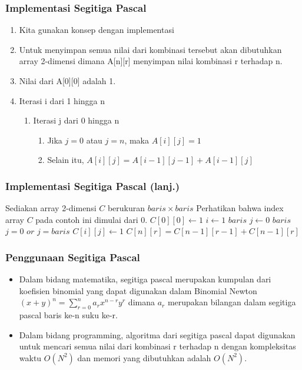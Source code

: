 \begin{frame}
\frametitle{Implementasi Segitiga Pascal}
\begin{enumerate}
  \item Kita gunakan konsep  dengan implementasi 
  \item Untuk menyimpan semua nilai dari kombinasi tersebut akan dibutuhkan array 2-dimensi dimana A[n][r] menyimpan nilai kombinasi r terhadap n.
  \item Nilai dari A[0][0] adalah 1.
  \item Iterasi i dari 1 hingga n
  \begin{enumerate}
    \item Iterasi j dari 0 hingga n
    \begin{enumerate}
      \item Jika $j = 0$ atau $j = n$, maka $A[i][j] = 1$
      \item Selain itu, $A[i][j] = A[i-1][j-1] + A[i-1][j]$
    \end{enumerate}
  \end{enumerate}
\end{enumerate}
\end{frame}

\begin{frame}[fragile]
\frametitle{Implementasi Segitiga Pascal (lanj.)}
\begin{codebox}
\li \Comment Sediakan array 2-dimensi $C$ berukuran $baris \times baris$
\li \Comment Perhatikan bahwa index array $C$ pada contoh ini dimulai dari 0.
\li $C[0][0] \gets 1$
\li \For $i \gets 1$ \To $baris$
    \Do
\li   \For $j \gets 0$ \To $baris$
      \Do
\li     \If $j = 0$ $or$ $j = baris$
        \Then
\li       $C[i][j] \gets 1$
\li     \Else
\li       $C[n][r] = C[n-1][r-1] + C[n-1][r]$
        \End
      \End
    \End
\end{codebox}
\end{frame}

\begin{frame}
\frametitle{Penggunaan Segitiga Pascal}
\begin{itemize}
  \item Dalam bidang matematika, segitiga pascal merupakan kumpulan dari koefisien binomial yang dapat digunakan dalam Binomial Newton $(x+y)^{n} = \sum\limits_{r=0}^{n} a_{r} x^{n-r} y^{r}$ dimana $a_{r}$ merupakan bilangan dalam segitiga pascal baris ke-n suku ke-r.
  \item Dalam bidang programming, algoritma dari segitiga pascal dapat digunakan untuk mencari semua nilai dari kombinasi r terhadap n dengan kompleksitas waktu $O(N^{2})$ dan memori yang dibutuhkan adalah $O(N^{2})$.
\end{itemize}
\end{frame}


